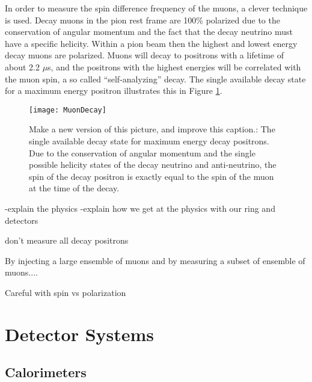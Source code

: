 In order to measure the spin difference frequency of the muons, a clever technique is used. Decay muons in the pion rest frame are 100\% polarized due to the conservation of angular momentum and the fact that the decay neutrino must have a specific helicity. Within a pion beam then the highest and lowest energy decay muons are polarized. Muons will 
decay to positrons with a lifetime of about 2.2 $\mu$s, and the positrons with the highest energies will be correlated with the muon spin, a so called ``self-analyzing'' decay. The single available decay state for a maximum energy positron illustrates this in Figure \ref{fig:MuonDecay}.

\begin{figure}[]
	\caption[Muon Decay - Max Energy Positron]{Make a new version of this picture, and improve this caption.: The single available decay state for maximum energy decay positrons. Due to the conservation of angular momentum and the single possible helicity states of the decay neutrino and anti-neutrino, the spin of the decay positron is exactly equal to the spin of the muon at the time of the decay.}
	\centering
	\texttt{[image: MuonDecay]}
	\label{fig:MuonDecay}
\end{figure}






-explain the physics
-explain how we get at the physics with our ring and detectors


don't measure all decay positrons


By injecting a large ensemble of muons and 
by measuring a subset of ensemble of muons....


Careful with spin vs polarization









\section{Detector Systems}
\label{sec:DetectorSystems}


\subsection{Calorimeters}
\label{sec:Calorimeters}



